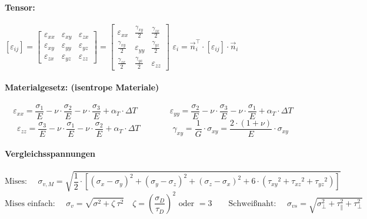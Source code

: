 \paragraph{Tensor:}
	$ 
	\left[\varepsilon_{ij}\right]
	=
	\left[\begin{matrix}
		\varepsilon_{xx} & \varepsilon_{xy} & \varepsilon_{zx} \\
		\varepsilon_{xy} & \varepsilon_{yy} & \varepsilon_{yz} \\
		\varepsilon_{zx} & \varepsilon_{yz} & \varepsilon_{zz}
	\end{matrix}\right]
	=
	\left[\begin{matrix}
		\varepsilon_{xx}      & \frac{\gamma_{xy}}{2} & \frac{\gamma_{zx}}{2} \\
		\frac{\gamma_{xy}}{2} & \varepsilon_{yy}      & \frac{\gamma_{yz}}{2} \\
		\frac{\gamma_{zx}}{2} & \frac{\gamma_{yz}}{2} & \varepsilon_{zz}
	\end{matrix}\right]
	$
	\hfil
	$ \varepsilon_i = \vec{n}_i^\top \cdot [\varepsilon_{ij}] \cdot \vec{n}_i $
	\hfil
	
\paragraph{Materialgesetz: (isentrope Materiale)}
	\[ 
		\varepsilon_{xx} = \dfrac{\sigma_1}{E} - \nu \cdot \dfrac {\sigma_2}{E} - \nu \cdot \dfrac{\sigma_3}{E} + \alpha_T \cdot \Delta T
		\qquad\qquad
		\varepsilon_{yy} = \dfrac{\sigma_2}{E} - \nu \cdot \dfrac {\sigma_3}{E} - \nu \cdot \dfrac{\sigma_1}{E} + \alpha_T \cdot \Delta T 
	\]
	\[
		\varepsilon_{zz} = \dfrac{\sigma_3}{E} - \nu \cdot \dfrac {\sigma_1}{E} - \nu \cdot \dfrac{\sigma_2}{E} + \alpha_T \cdot \Delta T
		\qquad\qquad
		\gamma_{xy} = \dfrac{1}{G} \cdot \sigma_{xy} = \dfrac{2 \cdot (1 + \nu)}{E} \cdot \sigma_{xy}
	\]
	
\paragraph{Vergleichsspannungen}
	\[ 
		\text{Mises: } \quad 
		\sigma_{v,M} = \sqrt{\dfrac{1}{2} \cdot \left[\left(\sigma_x-\sigma_y\right)^2+\left(\sigma_y-\sigma_z\right)^2+\left(\sigma_z-\sigma_x\right)^2+6\cdot\left({\tau_{xy}}^2+{\tau_{xz}}^2+{\tau_{yz}}^2\right)\right]}
	\]
	\[ 
	\text{Mises einfach: } \quad \sigma_v = \sqrt{\sigma^2 + \zeta\ \tau^2} \quad \zeta = \left(\dfrac{\sigma_D}{\tau_D}\right)^2 \text{ oder } = 3
	\qquad
	\text{Schweißnaht: }\quad \sigma_{vs} = \sqrt{\sigma_\perp^2 + \tau_\parallel^2 + \tau_\perp^2}
	\]

